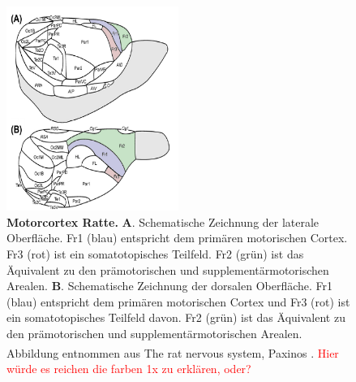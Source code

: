 \documentclass[12pt,a4paper,pdftex]{article}
\begin{document}
\begin{figure}[H]
    \centering
    \includegraphics[width=0.5\textwidth]{pictures/Bilder_Laura/rat_motorcortex_1.png}
    \caption[Motorcortex Ratte]{\textbf{Motorcortex Ratte.} \textbf{A}. Schematische Zeichnung der laterale Oberfläche. Fr1 (blau) entspricht dem primären motorischen Cortex. Fr3 (rot) ist ein somatotopisches Teilfeld. Fr2 (grün) ist das Äquivalent zu den prämotorischen und supplementärmotorischen Arealen. \textbf{B}. Schematische Zeichnung der dorsalen Oberfläche. Fr1 (blau) entspricht dem primären motorischen Cortex und Fr3 (rot) ist ein somatotopisches Teilfeld davon. Fr2 (grün) ist das Äquivalent zu den prämotorischen und supplementärmotorischen Arealen. Abbildung entnommen aus The rat nervous system, Paxinos \textsuperscript{\cite[22]{paxinos2014rat}}. \textcolor{red}{Hier würde es reichen die farben 1x zu erklären, oder?}}
    \label{fig:motorcortex_ratte}
\end{figure}
\end{document}
